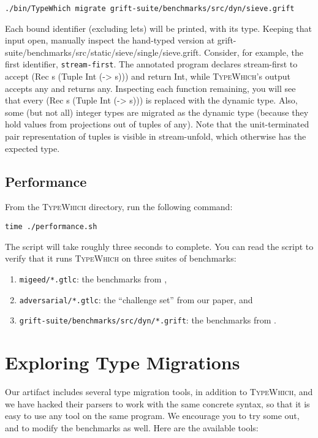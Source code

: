 \documentclass{book}
\newcommand{\system}{\textsc{TypeWhich}\xspace}
\begin{document}
\begin{verbatim}
./bin/TypeWhich migrate grift-suite/benchmarks/src/dyn/sieve.grift
\end{verbatim}

Each bound identifier (excluding lets) will be printed, with its
type. Keeping that input open, manually inspect the hand-typed version at
grift-suite/benchmarks/src/static/sieve/single/sieve.grift. Consider, for
example, the first identifier, \texttt{stream-first}. The annotated program
declares stream-first to accept (Rec s (Tuple Int (-> s))) and return Int,
while \system's output accepts any and returns any. Inspecting each function
remaining, you will see that every (Rec s (Tuple Int (-> s))) is replaced
with the dynamic type. Also, some (but not all) integer types are migrated as
the dynamic type (because they hold values from projections out of tuples of
any). Note that the unit-terminated pair representation of tuples is visible in
stream-unfold, which otherwise has the expected type.

\subsection{Performance}

From the \system{} directory, run the following command:
\begin{verbatim}
time ./performance.sh
\end{verbatim}

The script will take roughly three seconds to complete. You can read the script
to verify that it runs \system{} on three suites of benchmarks:
\begin{enumerate}
     \item \texttt{migeed/*.gtlc}: the benchmarks from \citet{migeed:decidable},
     \item \texttt{adversarial/*.gtlc}: the ``challenge set'' from our paper, and
     \item \texttt{grift-suite/benchmarks/src/dyn/*.grift}: the benchmarks from \citet{kuhlenschmidt:grift}.
\end{enumerate}

\section{Exploring Type Migrations}

Our artifact includes several type migration tools, in addition to \system, and
we have hacked their parsers to work with the same concrete syntax, so that it
is easy to use any tool on the same program. We encourage you to try some out,
and to modify the benchmarks as well. Here are the available tools:
\end{document}
